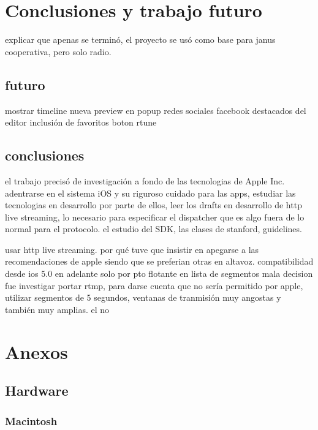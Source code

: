 
\chapter{Conclusiones y trabajo futuro}
explicar que apenas se terminó, el proyecto se usó como base para janus cooperativa, pero solo radio.


	\section{futuro}
	mostrar timeline nueva
	preview en popup
	redes sociales facebook
	destacados del editor
	inclusión de favoritos
	boton rtune
	
	
	\section{conclusiones}
	el trabajo precisó de investigación a fondo de las tecnologias de Apple Inc. adentrarse en el sistema iOS y su riguroso cuidado para las apps, estudiar las tecnologias en desarrollo por parte de ellos, leer los drafts en desarrollo de http live streaming, lo necesario para especificar el dispatcher que es algo fuera de lo normal para el protocolo.
	el estudio del SDK, las clases de stanford, guidelines.

	usar http live streaming.
	por qué tuve que insistir en apegarse a las recomendaciones de apple siendo que se preferian otras en altavoz.
	compatibilidad desde ios 5.0 en adelante	solo por pto flotante en lista de segmentos
	mala decision fue investigar portar rtmp, para darse cuenta que no sería permitido por apple, utilizar segmentos de 5 segundos, ventanas de tranmisión muy angostas y también muy amplias. el no 
	
		
	
	
\chapter{Anexos}
	\section{Hardware}
		\subsection{Macintosh}

